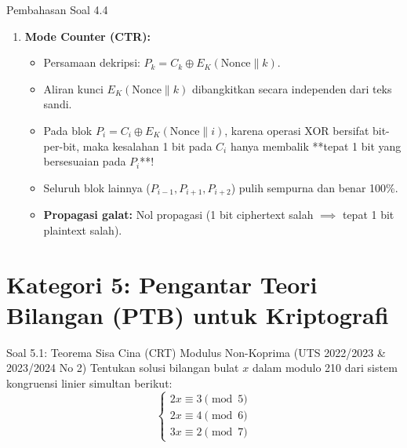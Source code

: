 \documentclass[11pt,a4paper]{article}
\begin{document}
\begin{solusibox}{Pembahasan Soal 4.4}
\begin{enumerate}[leftmargin=*]
\begin{itemize}
    \end{itemize}
    \item \textbf{Mode Counter (CTR):}
    \begin{itemize}
        \item Persamaan dekripsi: $P_k = C_k \oplus E_K(\text{Nonce} \parallel k)$.
        \item Aliran kunci $E_K(\text{Nonce} \parallel k)$ dibangkitkan secara independen dari teks sandi.
        \item Pada blok $P_i = C_i \oplus E_K(\text{Nonce} \parallel i)$, karena operasi XOR bersifat bit-per-bit, maka kesalahan 1 bit pada $C_i$ hanya membalik **tepat 1 bit yang bersesuaian pada $P_i$**!
        \item Seluruh blok lainnya ($P_{i-1}, P_{i+1}, P_{i+2}$) pulih sempurna dan benar 100\%.
        \item \textbf{Propagasi galat:} Nol propagasi (1 bit ciphertext salah $\implies$ tepat 1 bit plaintext salah).
    \end{itemize}
\end{enumerate}
\end{solusibox}

\newpage
\section{Kategori 5: Pengantar Teori Bilangan (PTB) untuk Kriptografi}

\begin{soalbox}{Soal 5.1: Teorema Sisa Cina (CRT) Modulus Non-Koprima (UTS 2022/2023 \& 2023/2024 No 2)}
Tentukan solusi bilangan bulat $x$ dalam modulo 210 dari sistem kongruensi linier simultan berikut:
\[
\begin{cases}
2x \equiv 3 \pmod 5 \\
2x \equiv 4 \pmod 6 \\
3x \equiv 2 \pmod 7
\end{cases}
\]
\end{soalbox}
\end{document}
